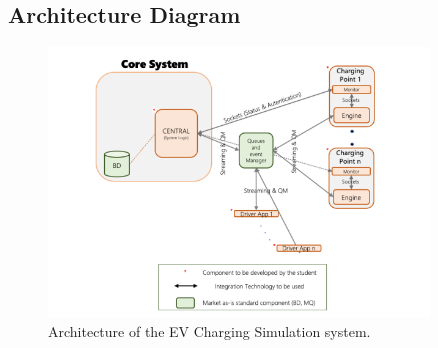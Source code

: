\documentclass[12pt,a4paper]{article}
\begin{document}
\subsection{Architecture Diagram}
\begin{figure}[h!]
    \centering
    \includegraphics[width=0.9\textwidth]{architecture.png}
    \caption{Architecture of the EV Charging Simulation system.}
\end{figure}
\end{document}
